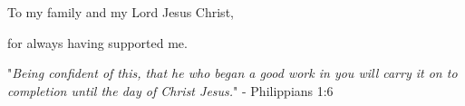 
{
\begin{dedication}
    To my family and my Lord Jesus Christ,

    for always having supported me.

    \vspace{40mm}

    "\textit{Being confident of this, that he who began a good work in you will carry it on to completion
    until the day of Christ Jesus.}" - Philippians 1:6
\end{dedication}
}